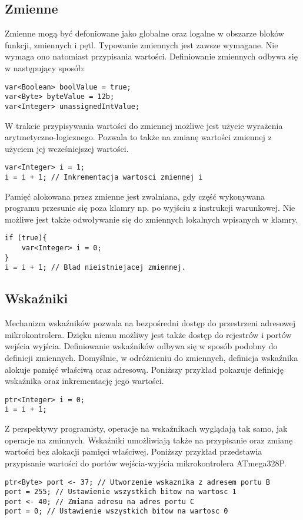 \subsection{Zmienne}
Zmienne mogą być defoniowane jako globalne oraz logalne w obszarze bloków funkcji, zmiennych i pętl. Typowanie zmiennych jest zawsze wymagane. Nie wymaga ono natomiast przypisania wartości. Definiowanie zmiennych odbywa się w następujący sposób:
\begin{lstlisting}
var<Boolean> boolValue = true;
var<Byte> byteValue = 12b;
var<Integer> unassignedIntValue;
\end{lstlisting}
W trakcie przypisywania wartości do zmiennej możliwe jest użycie wyrażenia arytmetyczno-logicznego. Pozwala to także na zmianę wartości zmiennej z użyciem jej wcześniejszej wartości.
\begin{lstlisting}
var<Integer> i = 1;
i = i + 1; // Inkrementacja wartosci zmiennej i
\end{lstlisting}
Pamięć alokowana przez zmienne jest zwalniana, gdy część wykonywana programu przesunie się poza klamry np. po wyjściu z instrukcji warunkowej. Nie możliwe jest także odwoływanie się do zmiennych lokalnych wpisanych w klamry.
\begin{lstlisting}
if (true){
	var<Integer> i = 0;
}
i = i + 1; // Blad nieistniejacej zmiennej.
\end{lstlisting}
\subsection{Wskaźniki}
Mechanizm wskaźników pozwala na bezpośredni dostęp do przestrzeni adresowej mikrokontrolera. Dzięku niemu możliwy jest także dostęp do rejestrów i portów wejścia wyjścia.
Definiowanie wskaźników odbywa się w sposób podobny do definicji zmiennych. Domyślnie, w odróżnieniu do zmiennych, definicja wskaźnika alokuje pamięć właściwą oraz adresową. Poniższy przykład pokazuje definicję wskaźnika oraz inkrementację jego wartości.
\begin{lstlisting}
ptr<Integer> i = 0;
i = i + 1;
\end{lstlisting}
Z perspektywy programisty, operacje na wskaźnikach wyglądają tak samo, jak operacje na zminnych.
Wskaźniki umożliwiają także na przypisanie oraz zmianę wartości bez alokacji pamięci właściwej. Poniższy przykład przedstawia przypisanie wartości do portów wejścia-wyjścia mikrokontrolera ATmega328P.
\begin{lstlisting}
ptr<Byte> port <- 37; // Utworzenie wskaznika z adresem portu B
port = 255; // Ustawienie wszystkich bitow na wartosc 1
port <- 40; // Zmiana adresu na adres portu C
port = 0; // Ustawienie wszystkich bitow na wartosc 0
\end{lstlisting}


